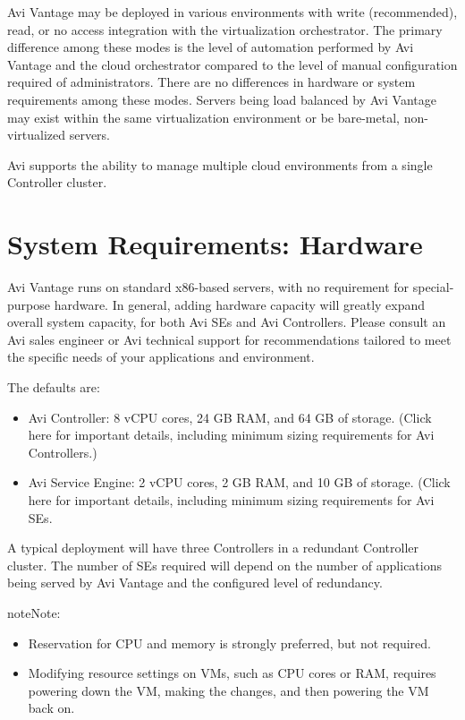 \documentclass[letterpaper,10pt,english]{sphinxmanual}
\begin{document}
Avi Vantage may be deployed in various environments with write (recommended), read, or no access integration with the virtualization orchestrator. The primary difference among these modes is the level of automation performed by Avi Vantage and the cloud orchestrator compared to the level of manual configuration required of administrators. There are no differences in hardware or system requirements among these modes. Servers being load balanced by Avi Vantage may exist within the same virtualization environment or be bare-metal, non-virtualized servers.

Avi supports the ability to manage multiple cloud environments from a single Controller cluster.


\section{System Requirements: Hardware}
\label{\detokenize{getting_started/requirements_hardware::doc}}\label{\detokenize{getting_started/requirements_hardware:system-requirements-hardware}}
Avi Vantage runs on standard x86-based servers, with no requirement for special-purpose hardware. In general, adding hardware capacity will greatly expand overall system capacity, for both Avi SEs and Avi Controllers. Please consult an Avi sales engineer or Avi technical support for recommendations tailored to meet the specific needs of your applications and environment.

The defaults are:
\begin{itemize}
\item {} 
Avi Controller: 8 vCPU cores, 24 GB RAM, and 64 GB of storage. (Click here for important details, including minimum sizing requirements for Avi Controllers.)

\item {} 
Avi Service Engine: 2 vCPU cores, 2 GB RAM, and 10 GB of storage. (Click here for important details, including minimum sizing requirements for Avi SEs.

\end{itemize}

A typical deployment will have three Controllers in a redundant Controller cluster. The number of SEs required will depend on the number of applications being served by Avi Vantage and the configured level of redundancy.

\begin{sphinxadmonition}{note}{Note:}\begin{itemize}
\item {} 
Reservation for CPU and memory is strongly preferred, but not required.

\item {} 
Modifying resource settings on VMs, such as CPU cores or RAM, requires powering down the VM, making the changes, and then powering the VM back on.

\end{itemize}
\end{sphinxadmonition}
\end{document}

